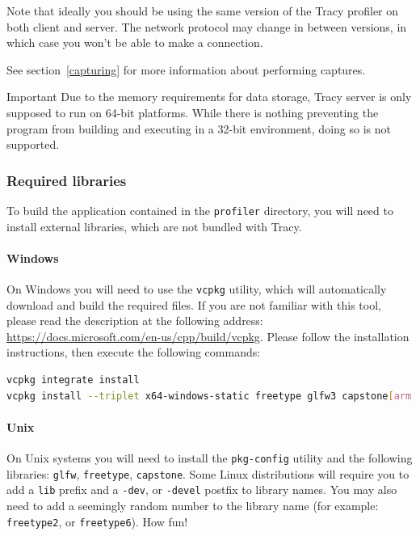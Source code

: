 \documentclass[hidelinks,titlepage,a4paper]{article}
\begin{document}
Note that ideally you should be using the same version of the Tracy profiler on both client and server. The network protocol may change in between versions, in which case you won't be able to make a connection.

See section~\ref{capturing} for more information about performing captures.

\begin{bclogo}[
noborder=true,
couleur=black!5,
logo=\bcbombe
]{Important}
Due to the memory requirements for data storage, Tracy server is only supposed to run on 64-bit platforms. While there is nothing preventing the program from building and executing in a 32-bit environment, doing so is not supported.
\end{bclogo}

\subsubsection{Required libraries}

To build the application contained in the \texttt{profiler} directory, you will need to install external libraries, which are not bundled with Tracy.

\paragraph{Windows}

On Windows you will need to use the \texttt{vcpkg} utility, which will automatically download and build the required files. If you are not familiar with this tool, please read the description at the following address: \url{https://docs.microsoft.com/en-us/cpp/build/vcpkg}. Please follow the installation instructions, then execute the following commands:

\begin{lstlisting}[language=sh]
vcpkg integrate install
vcpkg install --triplet x64-windows-static freetype glfw3 capstone[arm,arm64,x86]
\end{lstlisting}

\paragraph{Unix}

On Unix systems you will need to install the \texttt{pkg-config} utility and the following libraries: \texttt{glfw}, \texttt{freetype}, \texttt{capstone}. Some Linux distributions will require you to add a \texttt{lib} prefix and a \texttt{-dev}, or \texttt{-devel} postfix to library names. You may also need to add a seemingly random number to the library name (for example: \texttt{freetype2}, or \texttt{freetype6}). How fun!
\end{document}
